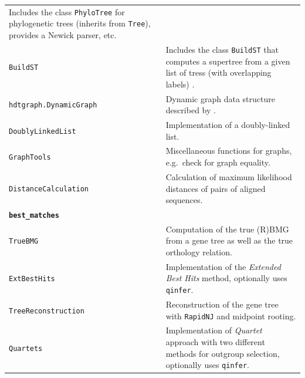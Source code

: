 \documentclass[hidelinks,11pt]{article}
\begin{document}
{\begin{longtable}{| p{4.0cm} | p{10cm} |}
	Includes the class \texttt{PhyloTree} for phylogenetic trees (inherits from \texttt{Tree}), provides a Newick parser, etc. \\
	\texttt{BuildST} & 
	Includes the class \texttt{BuildST} that computes a supertree from a given list of tress (with overlapping labels) \citep{deng2016}. \\
	\texttt{hdtgraph.DynamicGraph} & 
	Dynamic graph data structure described by \citet{holm2001}. \\
	\texttt{DoublyLinkedList} & 
	Implementation of a doubly-linked list. \\
	\texttt{GraphTools} & 
	Miscellaneous functions for graphs, e.g.\ check for graph equality. \\
	\texttt{DistanceCalculation} & 
	Calculation of maximum likelihood distances of pairs of aligned sequences. \\
	\hline
	\multicolumn{2}{|l|}{\textbf{\texttt{best\_matches}}}\\
	\hline
	\texttt{TrueBMG} & 
	Computation of the true (R)BMG from a gene tree as well as the true orthology relation. \\
	\texttt{ExtBestHits} & 
	Implementation of the \emph{Extended Best Hits} method, optionally uses \texttt{qinfer}. \\
	\texttt{TreeReconstruction} & 
	Reconstruction of the gene tree with \texttt{RapidNJ} \citep{simonsen2008} and midpoint rooting. \\
	\texttt{Quartets} & 
	Implementation of \emph{Quartet} approach with two different methods for outgroup selection, optionally uses \texttt{qinfer}. \\

\end{longtable}}
\end{document}
